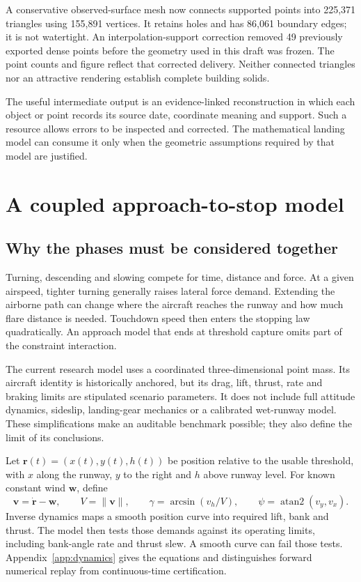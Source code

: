 A conservative observed-surface mesh now connects supported points into 225,371 triangles using 155,891 vertices. It retains holes and has 86,061 boundary edges; it is not watertight. An interpolation-support correction removed 49 previously exported dense points before the geometry used in this draft was frozen. The point counts and figure reflect that corrected delivery. Neither connected triangles nor an attractive rendering establish complete building solids.

The useful intermediate output is an evidence-linked reconstruction in which each object or point records its source date, coordinate meaning and support. Such a resource allows errors to be inspected and corrected. The mathematical landing model can consume it only when the geometric assumptions required by that model are justified.


\section{A coupled approach-to-stop model}
\label{sec:model}
\subsection{Why the phases must be considered together}
Turning, descending and slowing compete for time, distance and force. At a given airspeed, tighter turning generally raises lateral force demand. Extending the airborne path can change where the aircraft reaches the runway and how much flare distance is needed. Touchdown speed then enters the stopping law quadratically. An approach model that ends at threshold capture omits part of the constraint interaction.

The current research model uses a coordinated three-dimensional point mass. Its aircraft identity is historically anchored, but its drag, lift, thrust, rate and braking limits are stipulated scenario parameters. It does not include full attitude dynamics, sideslip, landing-gear mechanics or a calibrated wet-runway model. These simplifications make an auditable benchmark possible; they also define the limit of its conclusions.

Let $\mathbf r(t)=(x(t),y(t),h(t))$ be position relative to the usable threshold, with $x$ along the runway, $y$ to the right and $h$ above runway level. For known constant wind $\mathbf w$, define
\begin{equation}
\mathbf v=\dot{\mathbf r}-\mathbf w,\qquad V=\|\mathbf v\|,\qquad
\gamma=\arcsin(v_h/V),\qquad \psi=\operatorname{atan2}(v_y,v_x).
\end{equation}
Inverse dynamics maps a smooth position curve into required lift, bank and thrust. The model then tests those demands against its operating limits, including bank-angle rate and thrust slew. A smooth curve can fail those tests. Appendix~\ref{app:dynamics} gives the equations and distinguishes forward numerical replay from continuous-time certification.

